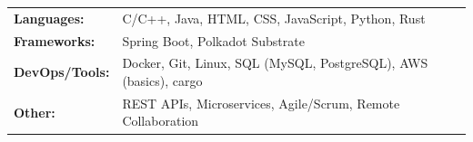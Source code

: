 
\begin{tabular}{ l l }
  \textbf{Languages:}     & C/C++, Java, HTML, CSS, JavaScript, Python, Rust \\
  \textbf{Frameworks:}    & Spring Boot, Polkadot Substrate \\
  \textbf{DevOps/Tools:}  & Docker, Git, Linux, SQL (MySQL, PostgreSQL), AWS (basics), cargo \\
  \textbf{Other:}         & REST APIs, Microservices, Agile/Scrum, Remote Collaboration \\
\end{tabular}
